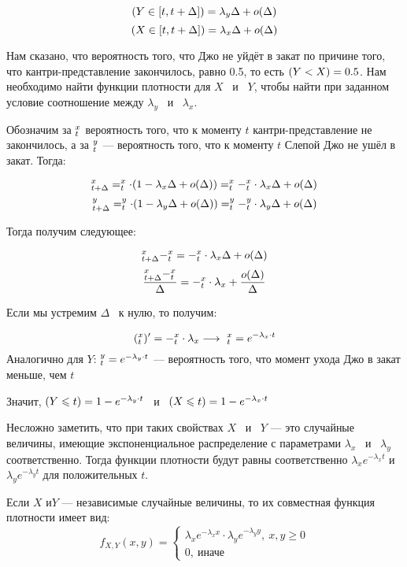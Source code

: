 \documentclass[11pt, a4paper]{article}
\let\P\relax
\DeclareMathOperator{\P}{\mathbb{P}}
\renewcommand{\leq}{\leqslant}
\renewcommand{\geq}{\geqslant}
\theoremstyle{definition}
\begin{document}
\begin{enumerate}
\begin{enumerate}
    \[ 
    \P(Y \in [t, t + \Delta]) = \lambda_y \Delta + o(\Delta)
    \]
    \[
    \P(X \in [t, t + \Delta]) = \lambda_x \Delta + o(\Delta)
    \]
    
    Нам сказано, что вероятность того, что Джо не уйдёт в закат по причине того, что кантри-представление закончилось, равно 0.5, то есть $\P(Y < X) = 0.5$. Нам необходимо найти функции плотности для $X$ \ и \ $Y$, чтобы найти при заданном условие соотношение между $\lambda_y$ \ и \ $\lambda_x$.
    
    Обозначим за $ \P_t^x$ вероятность того, что к моменту $t$ кантри-представление не закончилось, а за $\P_t^y$ — вероятность того, что к моменту $t$ Слепой Джо не ушёл в закат.
    Тогда:
    
    \[ 
    \P_{t+\Delta}^x = \P_t^x \cdot (1 - \lambda_x  \Delta + o(\Delta)) = \P_t^x - \P_t^x \cdot \lambda_x \Delta + o(\Delta)
    \]
    \[
    \P_{t+\Delta}^y = \P_t^y \cdot (1 - \lambda_y \Delta + o(\Delta)) = \P_t^y -\P_t^y \cdot \lambda_y \Delta + o(\Delta)
    \]
    
    Тогда получим следующее:
    
    \[
    \P_{t+\Delta}^x - \P_t^x = - \P_t^x \cdot \lambda_x \Delta + o(\Delta)
    \]
    \[ \frac{\P_{t+\Delta}^x - \P_t^x}{\Delta} = - \P_t^x \cdot \lambda_x + \frac{o(\Delta)}{\Delta}\]
    
    Если мы устремим $\Delta$ \ к нулю, то получим: 
    
    \[
    (\P_t^x)' = - \P_t^x \cdot \lambda_x \longrightarrow \ \P_t^x = e^{-\lambda_x\cdot t}
    \]
    Аналогично для $Y$: $ \P_t^y = e^{-\lambda_y\cdot t}$ — вероятность того, что момент ухода Джо в закат меньше, чем $t$
    
    Значит, $\P(Y \leq t) = 1 - e^{-\lambda_y\cdot t}$ \ и \ $\P(X \leq t) = 1 - e^{-\lambda_x\cdot t}$
    
    Несложно заметить, что при таких свойствах $X$ \ и \ $Y$ — это случайные величины, имеющие экспоненциальное распределение с параметрами $\lambda_x$ \ и \ $\lambda_y$ соответственно.
    Тогда функции плотности будут равны соответственно $\lambda_x e^{-\lambda_x t}$ и  $\lambda_y e^{- \lambda_y t}$ для положительных $t$. 
    
    Если $X$ и$Y$ — независимые случайные величины, то их совместная функция плотности имеет вид: 
    \[
    f_{X, Y}(x, y) = \begin{cases}
    \lambda_x e^{-\lambda_x x} \cdot \lambda_y e^{- \lambda_y y}, \ x, y \geq 0 \\
    0, \ \text{иначе}
    \end{cases}
    \]
    

\end{enumerate}
\end{enumerate}
\end{document}
